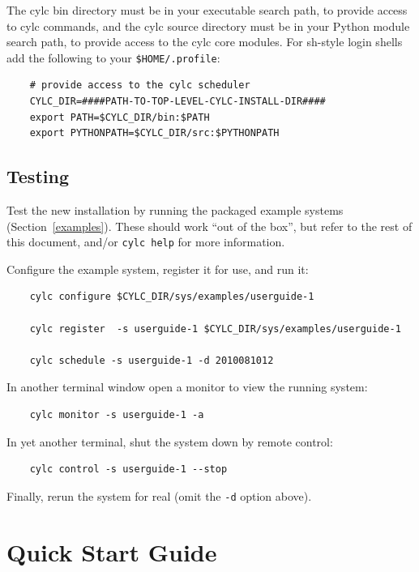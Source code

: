 \documentclass[11pt,a4paper]{article}
\begin{document}
The cylc bin directory must be in your executable search path, to
provide access to cylc commands, and the cylc source directory must be
in your Python module search path, to provide access to the cylc core
modules. For sh-style login shells add the following to
your \lstinline=$HOME/.profile=:

\lstset{language=bash} 

\begin{lstlisting}
    # provide access to the cylc scheduler
    CYLC_DIR=####PATH-TO-TOP-LEVEL-CYLC-INSTALL-DIR####
    export PATH=$CYLC_DIR/bin:$PATH
    export PYTHONPATH=$CYLC_DIR/src:$PYTHONPATH
\end{lstlisting}

\subsection{Testing} 
\label{Testing}

Test the new installation by running the packaged example systems
(Section~\ref{examples}). These should work ``out of the box'', but
refer to the rest of this document, and/or \lstinline=cylc help= for
more information.  

Configure the example system, register it for use, and run it:

\begin{lstlisting}
    cylc configure $CYLC_DIR/sys/examples/userguide-1

    cylc register  -s userguide-1 $CYLC_DIR/sys/examples/userguide-1

    cylc schedule -s userguide-1 -d 2010081012
\end{lstlisting}

In another terminal window open a monitor to view the running system:

\begin{lstlisting}
    cylc monitor -s userguide-1 -a
\end{lstlisting}

In yet another terminal, shut the system down by remote control:

\begin{lstlisting}
    cylc control -s userguide-1 --stop
\end{lstlisting}

Finally, rerun the system for real (omit the \lstinline{-d}
option above).

\pagebreak
\section{Quick Start Guide} 
\label{QuickStartGuide}
\end{document}

